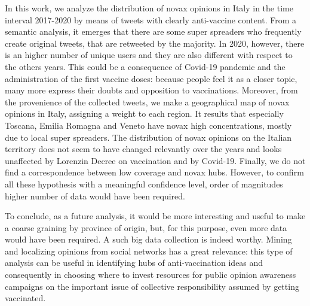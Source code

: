 \documentclass[prb,twocolumn,9pt]{revtex4-1}
\begin{document}
In this work, we analyze the distribution of novax opinions in Italy in the time interval 2017-2020 by means of tweets with clearly anti-vaccine content. From a semantic analysis, it emerges that there are some super spreaders who frequently create original tweets, that are retweeted by the majority. In 2020, however, there is an higher number of unique users and they are also different with respect to the others years. This could be a consequence of Covid-19 pandemic and the administration of the first vaccine doses: because people feel it as a closer topic, many more express their doubts and opposition to vaccinations. 
Moreover, from the provenience of the collected tweets, we make a geographical map of novax opinions in Italy, assigning a weight to each region. 
It results that especially Toscana, Emilia Romagna and Veneto have novax high concentrations, mostly due to local super spreaders. 
The distribution of novax opinions on the Italian territory does not seem to have changed relevantly over the years and looks unaffected by Lorenzin Decree on vaccination and by Covid-19. Finally, we do not find a correspondence between low coverage and novax hubs.
However, to confirm all these hypothesis with a meaningful confidence level, order of magnitudes higher number of data would have been required.

To conclude, as a future analysis, it would be more interesting and useful to make a coarse graining by province of origin, but, for this purpose, even more data would have been required. 
A such big data collection is indeed worthy. Mining and localizing opinions from social networks has a great relevance: this type of analysis can be useful in identifying hubs of anti-vaccination ideas and consequently in choosing where to invest resources for public opinion awareness campaigns on the important issue of collective responsibility assumed by getting vaccinated.




{}
\end{document}
